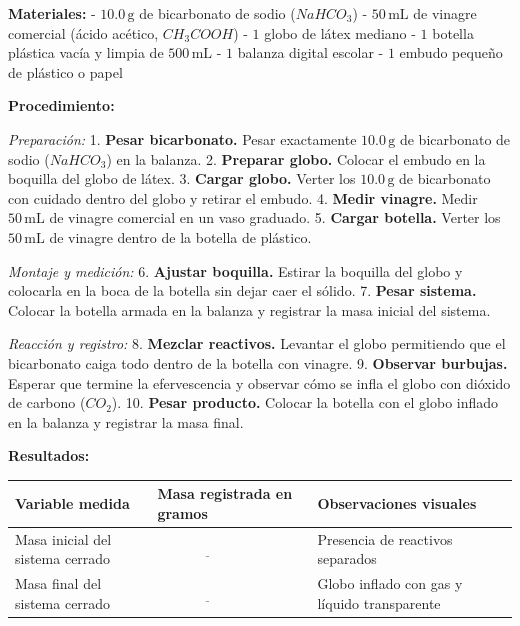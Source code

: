 \documentclass[
  spanish,
  letterpaper,
  12pt,
  oneside,
  open=any]{scrbook}
\newcounter{none} %
\begin{document}
\textbf{Materiales:} - \(10.0\,\text{g}\) de bicarbonato de sodio
(\(NaHCO_3\)) - \(50\,\text{mL}\) de vinagre comercial (ácido acético,
\(CH_3COOH\)) - \(1\) globo de látex mediano - \(1\) botella plástica
vacía y limpia de \(500\,\text{mL}\) - \(1\) balanza digital escolar -
\(1\) embudo pequeño de plástico o papel

\textbf{Procedimiento:}

\emph{Preparación:} 1. \textbf{Pesar bicarbonato.} Pesar exactamente
\(10.0\,\text{g}\) de bicarbonato de sodio (\(NaHCO_3\)) en la balanza.
2. \textbf{Preparar globo.} Colocar el embudo en la boquilla del globo
de látex. 3. \textbf{Cargar globo.} Verter los \(10.0\,\text{g}\) de
bicarbonato con cuidado dentro del globo y retirar el embudo. 4.
\textbf{Medir vinagre.} Medir \(50\,\text{mL}\) de vinagre comercial en
un vaso graduado. 5. \textbf{Cargar botella.} Verter los
\(50\,\text{mL}\) de vinagre dentro de la botella de plástico.

\emph{Montaje y medición:} 6. \textbf{Ajustar boquilla.} Estirar la
boquilla del globo y colocarla en la boca de la botella sin dejar caer
el sólido. 7. \textbf{Pesar sistema.} Colocar la botella armada en la
balanza y registrar la masa inicial del sistema.

\emph{Reacción y registro:} 8. \textbf{Mezclar reactivos.} Levantar el
globo permitiendo que el bicarbonato caiga todo dentro de la botella con
vinagre. 9. \textbf{Observar burbujas.} Esperar que termine la
efervescencia y observar cómo se infla el globo con dióxido de carbono
(\(CO_2\)). 10. \textbf{Pesar producto.} Colocar la botella con el globo
inflado en la balanza y registrar la masa final.

\textbf{Resultados:}

{\def\LTcaptype{none} %
\begin{longtable}[]{@{}
  >{\raggedright\arraybackslash}p{}
  >{\raggedright\arraybackslash}p{}
  >{\raggedright\arraybackslash}p{}@{}}
\toprule\noalign{}
\begin{minipage}[b]{\linewidth}\raggedright
Variable medida
\end{minipage} & \begin{minipage}[b]{\linewidth}\raggedright
Masa registrada en gramos
\end{minipage} & \begin{minipage}[b]{\linewidth}\raggedright
Observaciones visuales
\end{minipage} \\
\midrule\noalign{}
\endhead
\bottomrule\noalign{}
\endlastfoot
Masa inicial del sistema cerrado & \(\underline{\hspace{3cm}}\) &
Presencia de reactivos separados \\
Masa final del sistema cerrado & \(\underline{\hspace{3cm}}\) & Globo
inflado con gas y líquido transparente \\
\end{longtable}
}
\end{document}
